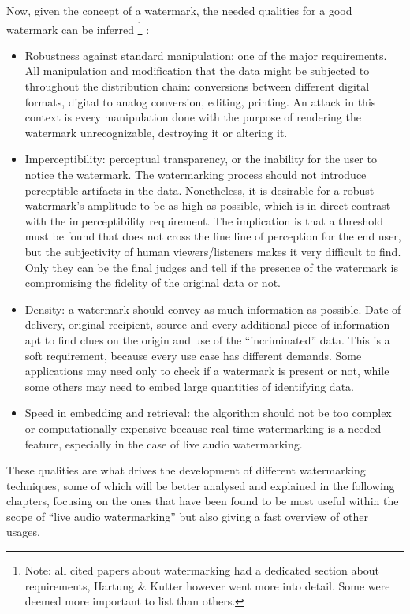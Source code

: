 Now, given the concept of a watermark, the needed qualities for a good watermark can be inferred \footnote{Note: all cited papers about watermarking had a dedicated section about requirements, Hartung \& Kutter however went more into detail. Some were deemed more important to list than others.} \cite[page 3, “Requirements”]{hartung} :
\begin{itemize}
	\item Robustness against standard manipulation: one of the major requirements. All manipulation and modification that the data might be subjected to throughout the distribution chain: conversions between different digital formats, digital to analog conversion, editing, printing. An attack in this context is every manipulation done with the purpose of rendering the watermark unrecognizable, destroying it or altering it.
	\item Imperceptibility: perceptual transparency, or the inability for the user to notice the watermark. The watermarking process should not introduce perceptible artifacts in the data. Nonetheless, it is desirable for a robust watermark's amplitude to be as high as possible, which is in direct contrast with the imperceptibility requirement. The implication is that a threshold must be found that does not cross the fine line of perception for the end user, but the subjectivity of human viewers/listeners makes it very difficult to find. Only they can be the final judges and tell if the presence of the watermark is compromising the fidelity of the original data or not.
	\item Density: a watermark should convey as much information as possible. Date of delivery, original recipient, source and every additional piece of information apt to find clues on the origin and use of the “incriminated” data. This is a soft requirement, because every use case has different demands. Some applications may need only to check if a watermark is present or not, while some others may need to embed large quantities of identifying data.
	\item Speed in embedding and retrieval: the algorithm should not be too complex or computationally expensive because real-time watermarking is a needed feature, especially in the case of live audio watermarking.
\end{itemize}

These qualities are what drives the development of different watermarking techniques, some of which will be better analysed and explained in the following chapters, focusing on the ones that have been found to be most useful within the scope of “live audio watermarking” but also giving a fast overview of other usages.

